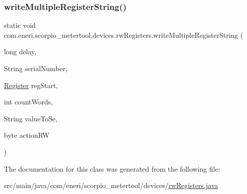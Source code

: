 \mbox{\label{classcom_1_1eneri_1_1scorpio__metertool_1_1devices_1_1rw_registers_a8fefbd4f57ff57078b49ef2ea7592e9d}} 
\subsubsection{\texorpdfstring{write\+Multiple\+Register\+String()}{writeMultipleRegisterString()}}
{\footnotesize\ttfamily static void com.\+eneri.\+scorpio\+\_\+metertool.\+devices.\+rw\+Registers.\+write\+Multiple\+Register\+String (\begin{DoxyParamCaption}\item[{long}]{delay,  }\item[{String}]{serial\+Number,  }\item[{\hyperlink{enumcom_1_1eneri_1_1scorpio__metertool_1_1devices_1_1_register}{Register}}]{reg\+Start,  }\item[{int}]{count\+Words,  }\item[{String}]{value\+To\+Se,  }\item[{byte}]{action\+RW }\end{DoxyParamCaption})\hspace{0.3cm}{\ttfamily [static]}}



The documentation for this class was generated from the following file\+:\begin{DoxyCompactItemize}
\item 
src/main/java/com/eneri/scorpio\+\_\+metertool/devices/\hyperlink{rw_registers_8java}{rw\+Registers.\+java}\end{DoxyCompactItemize}
